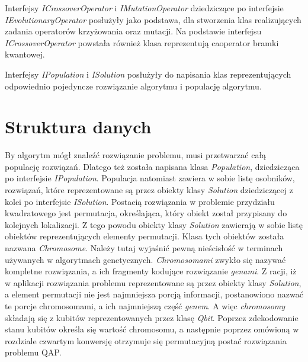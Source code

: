 Interfejsy \textit{ICrossoverOperator} i \textit{IMutationOperator} dziedziczące po interfejsie \textit{IEvolutionaryOperator} posłużyły jako podstawa, dla stworzenia klas realizujących zadania operatorów krzyżowania oraz mutacji. Na podstawie interfejsu \textit{ICrossoverOperator} powstała również klasa reprezentują caoperator bramki kwantowej.

Interfejsy \textit{IPopulation} i \textit{ISolution} posłużyły do napisania klas reprezentujących odpowiednio pojedyncze rozwiązanie algorytmu i populację algorytmu.

\section{Struktura danych}
By algorytm mógł znaleźć rozwiązanie problemu, musi przetwarzać całą populację rozwiązań. Dlatego też została napisana klasa \textit{Population}, dziedzicząca po interfejsie \textit{IPopulation}. Populacja natomiast zawiera w sobie listę osobników, rozwiązań, które reprezentowane są przez obiekty klasy \textit{Solution} dziedziczącej z kolei po interfejsie \textit{ISolution}. Postacią rozwiązania w problemie przydziału kwadratowego jest permutacja, określająca, który obiekt został przypisany do kolejnych lokalizacji. Z tego powodu obiekty klasy \textit{Solution} zawierają w sobie listę obiektów reprezentujących elementy permutacji. Klasa tych obiektów została nazwana \textit{Chromosome}. Należy tutaj wyjaśnić pewną nieścisłość w terminach używanych w algorytmach genetycznych. \textit{Chromosomami} zwykło się nazywać kompletne rozwiązania, a ich fragmenty kodujące rozwiązanie \textit{genami}. Z racji, iż w aplikacji rozwiązania problemu reprezentowane są przez obiekty klasy \textit{Solution}, a element permutacji nie jest najmniejsza porcją informacji, postanowiono nazwać te porcje chromosomami, a ich najmniejszą część \textit{genem}. A więc \textit{chromosomy} składają się z kubitów reprezentowanych przez klasę \textit{Qbit}. Poprzez zdekodowanie stanu kubitów określa się wartość chromosomu, a następnie poprzez omówioną w rozdziale czwartym konwersję otrzymuje się permutacyjną postać rozwiązania problemu QAP.
\newpage
